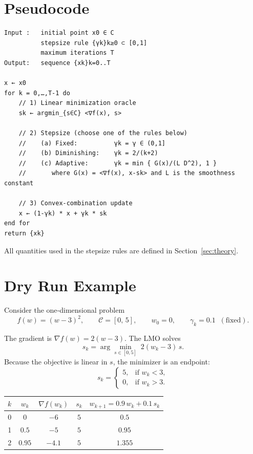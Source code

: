 \documentclass[11pt]{article}
\begin{document}
\section{Pseudocode}
\label{sec:pseudocode}
\begin{verbatim}
Input :   initial point x0 ∈ C
          stepsize rule {γk}k≥0 ⊂ [0,1]
          maximum iterations T
Output:   sequence {xk}k=0..T

x ← x0
for k = 0,…,T‑1 do
    // 1) Linear minimization oracle
    sk ← argmin_{s∈C} <∇f(x), s>

    // 2) Stepsize (choose one of the rules below)
    //    (a) Fixed:          γk = γ ∈ (0,1]
    //    (b) Diminishing:    γk = 2/(k+2)
    //    (c) Adaptive:       γk = min { G(x)/(L D^2), 1 }
    //       where G(x) = <∇f(x), x‑sk> and L is the smoothness constant

    // 3) Convex‑combination update
    x ← (1‑γk) * x + γk * sk
end for
return {xk}
\end{verbatim}
All quantities used in the stepsize rules are defined in Section~\ref{sec:theory}.

\section{Dry Run Example}
\label{sec:dryrun}
Consider the one‑dimensional problem
\[
f(w)=(w-3)^{2},
\qquad \mathcal C=[0,\,5],
\qquad w_{0}=0,
\qquad \gamma_{k}=0.1\;\;(\text{fixed}).
\]

The gradient is $\nabla f(w)=2(w-3)$.  The LMO solves
\[
s_{k}= \arg\min_{s\in[0,5]} \; 2(w_{k}-3)\,s .
\]
Because the objective is linear in $s$, the minimizer is an endpoint:
\[
s_{k}= 
\begin{cases}
5, & \text{if } w_{k}<3,\\[2mm]
0, & \text{if } w_{k}>3.
\end{cases}
\]

\begin{center}
\begin{tabular}{c|c|c|c|c}
$k$ & $w_{k}$ & $\nabla f(w_{k})$ & $s_{k}$ & $w_{k+1}=0.9\,w_{k}+0.1\,s_{k}$ \\ \hline
0 & $0$ & $-6$ & $5$ & $0.5$ \\
1 & $0.5$ & $-5$ & $5$ & $0.95$ \\
2 & $0.95$ & $-4.1$ & $5$ & $1.355$ 
\end{tabular}
\end{center}
\end{document}
